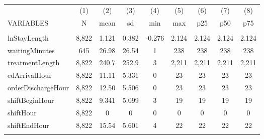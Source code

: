 \documentclass[]{article}
\begin{document}
\begin{tabular}{lcccccccc} \hline
 & (1) & (2) & (3) & (4) & (5) & (6) & (7) & (8) \\
VARIABLES & N & mean & sd & min & max & p25 & p50 & p75 \\ \hline
 &  &  &  &  &  &  &  &  \\
lnStayLength & 8,822 & 1.121 & 0.382 & -0.276 & 2.124 & 2.124 & 2.124 & 2.124 \\
waitingMinutes & 645 & 26.98 & 26.54 & 1 & 238 & 238 & 238 & 238 \\
treatmentLength & 8,822 & 240.7 & 252.9 & 3 & 2,211 & 2,211 & 2,211 & 2,211 \\
edArrivalHour & 8,822 & 11.11 & 5.331 & 0 & 23 & 23 & 23 & 23 \\
orderDischargeHour & 8,822 & 12.50 & 5.506 & 0 & 23 & 23 & 23 & 23 \\
shiftBeginHour & 8,822 & 9.341 & 5.099 & 3 & 19 & 19 & 19 & 19 \\
shiftHour & 8,822 & 0 & 0 & 0 & 0 & 0 & 0 & 0 \\
shiftEndHour & 8,822 & 15.54 & 5.601 & 4 & 22 & 22 & 22 & 22 \\
 &  &  &  &  &  &  &  &  \\ \hline
\end{tabular}
\end{document}
